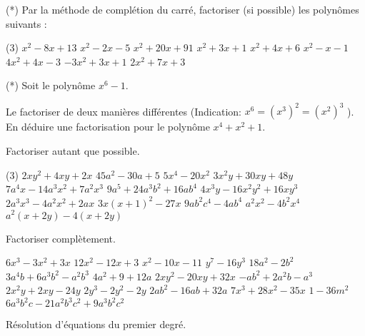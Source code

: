 \documentclass[a4paper,12pt]{report}
\begin{document}
\begin{acti}
(*) Par la méthode de complétion du carré, factoriser (si possible) les polynômes suivants :
	\begin{tasks}(3)
\task $x^2-8 x+13$
\task $x^2-2 x-5$
\task $x^2+20 x+91$
\task $x^2+3 x+1$
\task $x^2+4 x+6$
\task $x^2-x-1$
\task $4 x^2+4 x-3$
\task $-3 x^2+3 x+1$
\task $2 x^2+7 x+3$
	\end{tasks}
\end{acti}
\begin{acti}
(*) Soit le polynôme $x^6-1$.
	\begin{tasks}
\task Le factoriser de deux manières différentes (Indication: $x^6=\left(x^3\right)^2=\left(x^2\right)^3$ ).
\task En déduire une factorisation pour le polynôme $x^4+x^2+1$.
	\end{tasks}
\end{acti}
\begin{acti}
Factoriser autant que possible.
	\begin{tasks}(3)
\task $2 x y^2+4 x y+2 x$
\task $45 a^2-30 a+5$
\task $5 x^4-20 x^2$
\task $3 x^2 y+30 x y+48 y$
\task $7 a^4 x-14 a^3 x^2+7 a^2 x^3$
\task $9 a^5+24 a^3 b^2+16 a b^4$
\task $4 x^3 y-16 x^2 y^2+16 x y^3$
\task $2 a^3 x^3-4 a^2 x^2+2 a x$
\task $3 x(x+1)^2-27 x$
\task $9 a b^2 c^4-4 a b^4$
\task $a^2 x^2-4 b^2 x^4$
\task $a^2(x+2 y)-4(x+2 y)$
	\end{tasks}
\end{acti}

\begin{acti}
Factoriser complètement.
	\begin{tasks}
\task $6 x^3-3 x^2+3 x$
\task $12 x^2-12 x+3$
\task $x^2-10 x-11$
\task $y^7-16 y^3$
\task $18 a^2-2 b^2$
\task $3 a^4 b+6 a^3 b^2-a^2 b^3$
\task $4 a^2+9+12 a$
\task $2 x y^2-20 x y+32 x$
\task $-a b^2+2 a^2 b-a^3$
\task $2 x^2 y+2 x y-24 y$
\task $2 y^3-2 y^2-2 y$
\task $2 a b^2-16 a b+32 a$
\task $7 x^3+28 x^2-35 x$
\task $1-36 m^2$
\task $6 a^3 b^2 c-21 a^2 b^3 c^2+9 a^3 b^2 c^2$
	\end{tasks}
\end{acti}
Résolution d'équations du premier degré.
\end{document}
